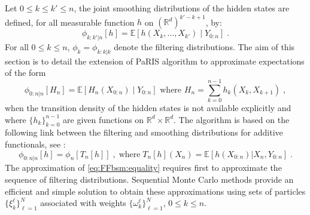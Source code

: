 \documentclass[12pt]{article}
\newcommand{\eqsp}{\;}
\newcommand{\1}{\mathrm{1}}
\newcommand{\E}{\mathbb{E}}
\begin{document}
Let $0 \leq k \leq k' \leq n$, the joint smoothing distributions of the hidden states are defined, for all measurable function $h$ on $(\mathbb{R}^d)^{k'-k + 1}$, by:
\[
\phi_{k:k'|n}[h] = \mathbb{E}\left[h(X_k,\ldots,X_{k'})\middle|Y_{0:n}\right]\eqsp.
\]
For all $0\le k\le n$, $\phi_{k} = \phi_{k:k|k}$ denote the filtering distributions. The aim of this section is to detail the extension of PaRIS algorithm to approximate expectations of the form
\begin{equation}
\label{def:addfunc}
\phi_{0:n\vert n}[H_{n}] = \mathbb{E}\left[H_n(X_{0:n})\middle|Y_{0:n}\right] \text{ where } H_n=\sum_{k=0}^{n-1}h_k(X_k,X_{k+1})\eqsp,
\end{equation}
when the transition density of the hidden states is not available explicitly and where $\{h_k\}_{k=0}^{n-1}$ are given functions on $\mathbb{R}^d\times \mathbb{R}^d$. 
The algorithm is based on the following link between the filtering and smoothing distributions for additive functionals, see \cite{olsson:westerborn:2016}:
\begin{equation}
\phi_{0:n|n}[h] = \phi_n[T_n[h]]\eqsp,\;\mbox{where}\; T_n[h](X_n) = \E\left[h(X_{0:n})\vert X_n,Y_{0:n}\right]\eqsp.\label{eq:FFbsm:equality}
\end{equation}
The approximation of \eqref{eq:FFbsm:equality} requires first to approximate the sequence of filtering distributions. 
Sequential Monte Carlo methods provide an efficient and simple solution to obtain these approximations using sets of particles $\{\xi^{\ell}_k\}_{\ell=1}^N$ associated with weights $\{\omega^{\ell}_k\}_{\ell=1}^N$, $0\le k \le n$.
\end{document}
